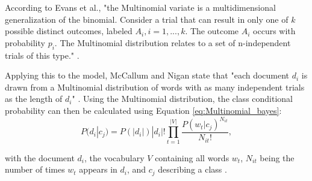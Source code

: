        According to Evans et al., "the Multinomial variate is a multidimensional generalization of the binomial. Consider a trial that can result in only one of $k$ possible distinct outcomes, labeled $A_i, i = 1,...,k$. The outcome $A_i$ occurs with probability $p_i$. The Multinomial distribution relates to a set of n-independent trials of this type." \cite[p.~135]{evans2011statistical}.
        
        Applying this to the model, McCallum and Nigan state that "each document $d_i$ is drawn from a Multinomial distribution of words with as many independent trials as the length of $d_i$" \cite[p.~3]{Mccallum1998}. Using the Multinomial distribution, the class conditional probability can then be calculated using Equation \eqref{eq:Multinomial_bayes}:
        \begin{equation}
            \label{eq:Multinomial_bayes}
                P(d_i|c_j) = P(|d_i|)|d_i|!\prod_{t=1}^{|V|}\frac{P(w_t|c_j)^{N_{it}}}{N_{it}!},
        \end{equation}
        
        with the document $d_i$, the vocabulary $V$ containing all words $w_t$, $N_{it}$ being the number of times $w_t$ appears in $d_i$, and $c_j$ describing a class \cite{Mccallum1998}. 
        
